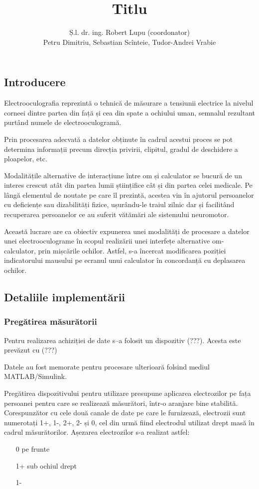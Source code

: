 \documentclass[12pt]{article}
\author{Ș.l. dr. ing. Robert Lupu (coordonator)\\Petru Dimitriu, Sebastian Scînteie, Tudor-Andrei Vrabie}
\title{Titlu}
\begin{document}
	\maketitle
	
	\begin{multicols}{2}
	\subsection*{Introducere}
	Electrooculografia reprezintă o tehnică de măsurare a tensiunii electrice la nivelul corneei dintre partea din față și cea din spate a ochiului uman, semnalul rezultant purtând numele de electrooculogramă.
	
	Prin procesarea adecvată a datelor obținute în cadrul acestui proces se pot determina informații precum direcția privirii, clipitul, gradul de deschidere a ploapelor, etc.
	
	Modalitățile alternative de interacțiune între om și calculator se bucură de un interes crescut atât din partea lumii științifice cât și din partea celei medicale. Pe lângă elementul de noutate pe care îl prezintă, acestea vin în ajutorul persoanelor cu deficiențe sau dizabilități fizice, ușurându-le traiul zilnic dar și facilitând recuperarea persoanelor ce au suferit vătămări ale sistemului neuromotor.
	
	Această lucrare are ca obiectiv expunerea unei modalități de procesare a datelor unei electrooculograme în scopul realizării unei interfețe alternative om-calculator, prin mișcările ochilor. Astfel, s-a încercat modificarea poziției indicatorului mausului pe ecranul unui calculator în concordanță cu deplasarea ochilor.
	
	\subsection*{Detaliile implementării}
	\subsubsection*{Pregătirea măsurătorii}
	Pentru realizarea achiziției de date s–a folosit un dispozitiv (???). Acesta este prevăzut cu (???)
	
	Datele au fost memorate pentru procesare ulterioară folsind mediul MATLAB/Simulink.
	
	Pregătirea dispozitivului pentru utilizare presupune aplicarea electrozilor pe fața persoanei pentru care se realizează măsurători, într-o aranjare bine stabilită. Corespunzător cu cele două canale de date pe care le furnizează, electrozii sunt numerotați 1+, 1-, 2+, 2- și 0, cel din urmă fiind electrodul utilizat drept masă în cadrul măsurătorilor. Așezarea electrozilor s-a realizat astfel:
	\begin{itemize}
		\item [0] pe frunte
		\item [1+] sub ochiul drept
		\item [1-] 
	\end{itemize}

\end{multicols}
\end{document}
